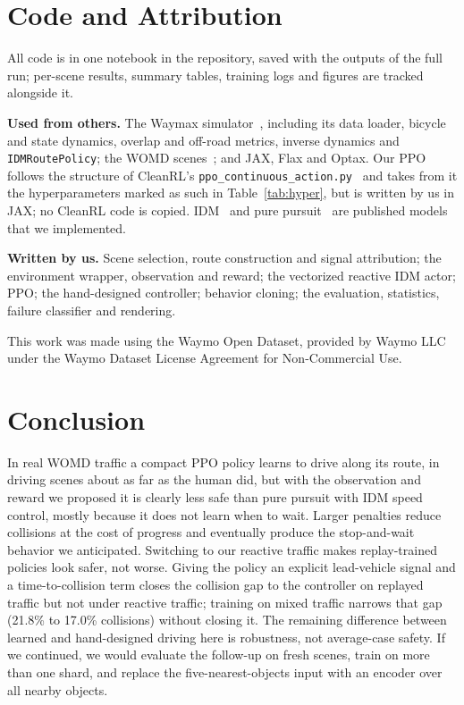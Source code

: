 \documentclass[conference]{IEEEtran}
\begin{document}
\section{Code and Attribution}\label{sec:attribution}

All code is in one notebook in the repository, saved with the outputs of the full run;
per-scene results, summary tables, training logs and figures are tracked alongside it.

\textbf{Used from others.} The Waymax simulator~\cite{gulino2023waymax}, including its
data loader, bicycle and state dynamics, overlap and off-road metrics, inverse dynamics
and \texttt{IDMRoutePolicy}; the WOMD scenes~\cite{ettinger2021womd}; and JAX, Flax and
Optax. Our PPO follows the structure of CleanRL's \texttt{ppo\_continuous\_action.py}~\cite{huang2022cleanrl} and takes from it the hyperparameters marked as such in Table~\ref{tab:hyper}, but is written by us in JAX;
no CleanRL code is copied. IDM~\cite{treiber2000idm} and pure
pursuit~\cite{coulter1992purepursuit} are published models that we implemented.

\textbf{Written by us.} Scene selection, route construction and signal attribution; the
environment wrapper, observation and reward; the vectorized reactive IDM actor; PPO; the
hand-designed controller; behavior cloning; the evaluation, statistics, failure
classifier and rendering.

This work was made using the Waymo Open Dataset, provided by Waymo LLC under the Waymo
Dataset License Agreement for Non-Commercial Use.

\section{Conclusion}

In real WOMD traffic a compact PPO policy learns to drive along its route, in driving scenes about as far as the human did, but with the observation and reward we proposed it is clearly less
safe than pure pursuit with IDM speed control, mostly because it does not learn when to
wait. Larger penalties reduce collisions at the cost of progress and eventually produce
the stop-and-wait behavior we anticipated. Switching to our reactive traffic makes replay-trained policies look safer, not worse. Giving the policy an explicit lead-vehicle
signal and a time-to-collision term closes the collision gap to the controller on
replayed traffic but not under reactive traffic; training on mixed traffic narrows that
gap (21.8\% to 17.0\% collisions) without closing it. The remaining difference between
learned and hand-designed driving here is robustness, not average-case safety. If we
continued, we would evaluate the follow-up on fresh scenes, train on more than one shard,
and replace the five-nearest-objects input with an encoder over all nearby
objects.



\end{document}
